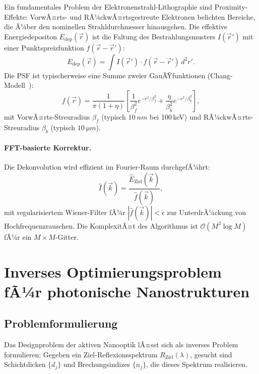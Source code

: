 ﻿\documentclass[a4paper,12pt]{scrreprt}
\theoremstyle{definition}
\newcommand{\ordre}[1]{\mathcal{O}\!\left(#1\right)}
\begin{document}
Ein fundamentales Problem der Elektronenstrahl-Lithographie sind
Proximity-Effekte: VorwÃ¤rts- und RÃ¼ckwÃ¤rtsgestreute Elektronen belichten
Bereiche, die Ã¼ber den nominellen Strahldurchmesser hinausgehen. Die
effektive Energiedepositon $E_\mathrm{dep}(\vec{r})$ ist die Faltung des
Bestrahlungsmusters $I(\vec{r}')$ mit einer Punktspreizfunktion $f(\vec{r} - \vec{r}')$:
\begin{equation}
  E_\mathrm{dep}(\vec{r}) = \int I(\vec{r}') \cdot f(\vec{r} - \vec{r}')\, d^2r'.
\end{equation}
Die PSF ist typischerweise eine Summe zweier GauÃŸfunktionen (Chang-Modell~\cite{Chang1975}):
\begin{equation}
  f(\vec{r}) = \frac{1}{\pi(1+\eta)}
  \left[\frac{1}{\beta_f^2} e^{-r^2/\beta_f^2} + \frac{\eta}{\beta_b^2} e^{-r^2/\beta_b^2}\right],
\end{equation}
mit VorwÃ¤rts-Streuradius $\beta_f$ (typisch $\SI{10}{nm}$ bei 100\,keV) und
RÃ¼ckwÃ¤rts-Streuradius $\beta_b$ (typisch $\SI{10}{\micro m}$).

\paragraph{FFT-basierte Korrektur.}
Die Dekonvolution wird effizient im Fourier-Raum durchgefÃ¼hrt:
\begin{equation}
  \hat{I}(\vec{k}) = \frac{\hat{E}_\mathrm{Ziel}(\vec{k})}{\hat{f}(\vec{k})},
\end{equation}
mit regularisiertem Wiener-Filter fÃ¼r $|\hat{f}(\vec{k})| < \epsilon$ zur
UnterdrÃ¼ckung von Hochfrequenzrauschen. Die KomplexitÃ¤t des Algorithmus ist
$\ordre{M^2 \log M}$ fÃ¼r ein $M \times M$-Gitter.

\section{Inverses Optimierungsproblem fÃ¼r photonische Nanostrukturen}

\subsection{Problemformulierung}

Das Designproblem der aktiven Nanooptik lÃ¤sst sich als inverses Problem
formulieren: Gegeben ein Ziel-Reflexionsspektrum $R_\mathrm{Ziel}(\lambda)$,
gesucht sind Schichtdicken $\{d_j\}$ und Brechungsindizes $\{n_j\}$, die
dieses Spektrum realisieren.
\end{document}
